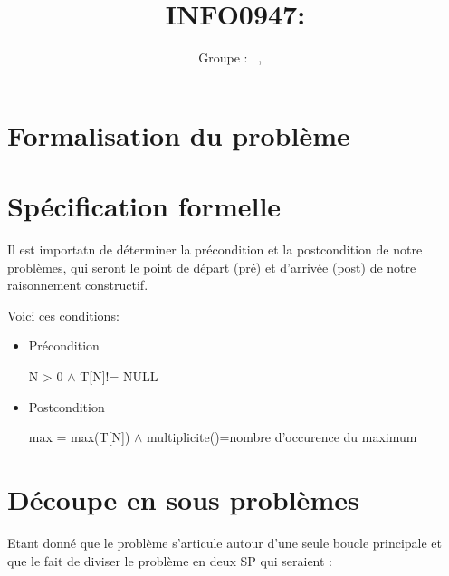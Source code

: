 \documentclass[a4paper, 11pt, oneside]{article}
\title{INFO0947: \intitule}
\author{Groupe \GrNbr : \PrenomUN~\textsc{\NomUN}, \PrenomDEUX~\textsc{\NomDEUX}}
\date{}
\newcommand{\tablemat}{~}
\renewcommand{\tablemat}{\tableofcontents}
\begin{document}
\maketitle
\newpage
\tablemat
\newpage


\section{Formalisation du problème}





\section{Spécification formelle}

Il est importatn de déterminer la précondition et la postcondition de notre problèmes, qui seront le point de départ (pré) et d'arrivée (post)  de notre raisonnement constructif.

Voici ces conditions:

\begin{itemize}

\item Précondition

\begin{center}
    
 N > 0 $\land$ T[N]!= NULL    

\end{center}

\item Postcondition

\begin{center}
    
 max = max(T[N]) $\land$ multiplicite()=nombre d'occurence du maximum 

\end{center}

\end{itemize}


\section{Découpe en sous problèmes}

Etant donné que le problème s'articule autour d'une seule boucle principale et que le fait de diviser le problème en deux SP qui seraient :
\end{document}
